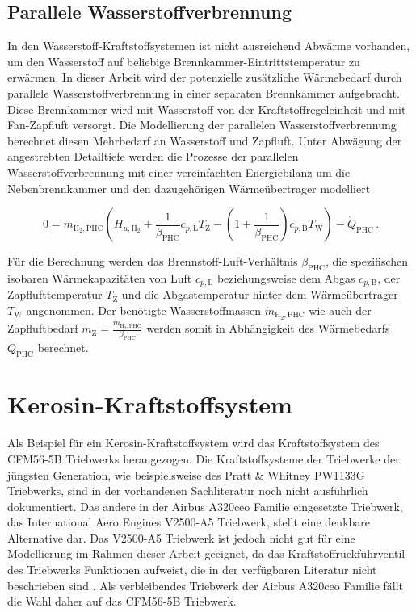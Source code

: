 \subsection{Parallele Wasserstoffverbrennung}

In den Wasserstoff-Kraftstoffsystemen ist nicht ausreichend Abwärme vorhanden, um den Wasserstoff auf beliebige Brennkammer-Eintrittstemperatur zu erwärmen. In dieser Arbeit wird der potenzielle zusätzliche Wärmebedarf durch parallele Wasserstoffverbrennung in einer separaten Brennkammer aufgebracht. Diese Brennkammer wird mit Wasserstoff von der Kraftstoffregeleinheit und mit Fan-Zapfluft versorgt. Die Modellierung der parallelen Wasserstoffverbrennung berechnet diesen Mehrbedarf an Wasserstoff und Zapfluft. Unter Abwägung der angestrebten Detailtiefe werden die Prozesse der parallelen Wasserstoffverbrennung mit einer vereinfachten Energiebilanz um die Nebenbrennkammer und den dazugehörigen Wärmeübertrager modelliert 

\begin{equation}\label{Eq:phc}
	0 = \dot{m}_{\mathrm{H}_2, \mathrm{PHC}}\left(H_{u, \mathrm{H}_2} + \frac{1}{\beta_\mathrm{PHC}}c_{p,\mathrm{L}} T_\mathrm{Z} - \left(1+\frac{1}{\beta_\mathrm{PHC}}\right)c_{p,\mathrm{B}} T_\mathrm{W}\right)-\dot{Q}_\mathrm{PHC}\,.
\end{equation}

Für die Berechnung werden das Brennstoff-Luft-Verhältnis $\beta_\mathrm{PHC}$, die spezifischen isobaren Wärmekapazitäten von Luft $c_{p,\mathrm{L}}$ beziehungsweise dem Abgas $c_{p,\mathrm{B}}$, der Zapflufttemperatur $T_\mathrm{Z}$ und die Abgastemperatur hinter dem Wärmeübertrager $T_\mathrm{W}$ angenommen. Der benötigte Wasserstoffmassen $\dot{m}_{\mathrm{H}_2, \mathrm{PHC}}$ wie auch der Zapfluftbedarf $\dot{m}_\mathrm{Z} = \frac{\dot{m}_{\mathrm{H}_2, \mathrm{PHC}}}{\beta_\mathrm{PHC}}$ werden somit in Abhängigkeit des Wärmebedarfs $\dot{Q}_\mathrm{PHC}$ berechnet.

\section{Kerosin-Kraftstoffsystem}

Als Beispiel für ein Kerosin-Kraftstoffsystem wird das Kraftstoffsystem des CFM56-5B Triebwerks herangezogen. Die Kraftstoffsysteme der Triebwerke der jüngsten Generation, wie beispielsweise des Pratt \& Whitney PW1133G Triebwerks, sind in der vorhandenen Sachliteratur noch nicht ausführlich dokumentiert. Das andere in der Airbus A320ceo Familie eingesetzte Triebwerk, das International Aero Engines V2500-A5 Triebwerk, stellt eine denkbare Alternative dar. Das V2500-A5 Triebwerk ist jedoch nicht gut für eine Modellierung im Rahmen dieser Arbeit geeignet, da das Kraftstoffrückführventil des Triebwerks Funktionen aufweist, die in der verfügbaren Literatur nicht beschrieben sind \cite{LinkeDiesinger.2014}. Als verbleibendes Triebwerk der Airbus A320ceo Familie fällt die Wahl daher auf das CFM56-5B Triebwerk. 

